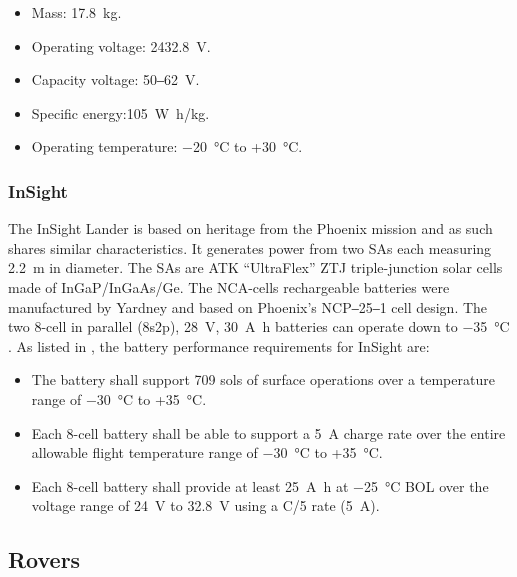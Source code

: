 \begin{itemize}
	\item Mass: \SI{17.8}{\kilo\gram}.
	\item Operating voltage: 24\SI{32.8}{\volt}.
	\item Capacity voltage: 50‒\SI{62}{\volt}.
	\item Specific energy:\SI{105}{\watt\hour/\kilo\gram}.
    \item Operating temperature: \SI{-20}{\celsius} to +\SI{30}{\celsius}.
\end{itemize}

\subsubsection{InSight}

The InSight Lander is based on heritage from the Phoenix mission and as such shares similar characteristics. It generates power from two \acp{SA} each measuring \SI{2.2}{\meter} in diameter. The \acp{SA} are  ATK ``UltraFlex'' ZTJ triple-junction solar cells made of \ac{InGaP}/\ac{InGaAs}/\ac{Ge}. The \ac{NCA}-cells rechargeable batteries were manufactured by Yardney and based on Phoenix's NCP‒25‒1 cell design. The two 8-cell in parallel (8s2p), \SI{28}{\volt}, \SI{30}{\ampere\hour} batteries can operate down to \SI{-35}{\celsius} . As listed in , the battery performance requirements for InSight are:

\begin{itemize}
  \item The battery shall support 709 sols of surface operations over a temperature range of \SI{-30}{\celsius} to +\SI{35}{\celsius}.
  \item Each 8-cell battery shall be able to support a \SI{5}{\ampere} charge rate over the entire allowable flight temperature range of \SI{-30}{\celsius} to +\SI{35}{\celsius}.
  \item Each 8-cell battery shall provide at least \SI{25}{\ampere\hour} at \SI{-25}{\celsius} \ac{BOL} over the voltage range of \SI{24}{\volt} to \SI{32.8}{\volt} using a C/5 rate (\SI{5}{\ampere}).
\end{itemize}

\clearpage
\subsection{Rovers}
\label{sec:StateOfTheArt:PastAndOngoingMissions:Rovers}


